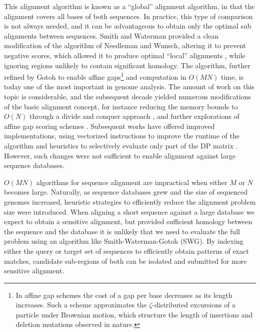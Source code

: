 This alignment algorithm is known as a ``global'' alignment algorithm, in that the alignment covers all bases of both sequences.
In practice, this type of comparison is not always needed, and it can be advantageous to obtain only the optimal sub alignments between sequences.
Smith and Waterman provided a clean modification of the algorithm of Needleman and Wunsch, altering it to prevent negative scores, which allowed it to produce optimal ``local'' alignments \cite{smith1981comparison}, while ignoring regions unlikely to contain significant homology.
The algorithm, further refined by Gotoh \cite{gotoh1982improved} to enable affine gaps\footnote{In affine gap schemes the cost of a gap per base decreases as its length increases. Such a scheme approximates the $\zeta$-distributed excursions of a particle under Brownian motion, which structure the length of insertions and deletion mutations observed in nature.} and computation in $O(MN)$ time, is today one of the most important in genome analysis.
The amount of work on this topic is considerable, and the subsequent decade yielded numerous modifications of the basic alignment concept, for instance reducing the memory bounds to $O(N)$ through a divide and conquer approach \cite{myers1988optimal}, and further explorations of affine gap scoring schemes \cite{altschul1986optimal,gotoh1990optimal}.
Subsequent works have offered improved implementations, using vectorized instructions to improve the runtime of the algorithm \cite{farrar2007striped} and heuristics to selectively evaluate only part of the DP matrix \cite{suzuki2017acceleration}.
However, such changes were not sufficient to enable alignment against large sequence databases.

$O(MN)$ algorithms for sequence alignment are impractical when either $M$ or $N$ becomes large.
Naturally, as sequence databases grew and the size of sequenced genomes increased, heuristic strategies to efficiently reduce the alignment problem size were introduced.
When aligning a short sequence against a large database we expect to obtain a sensitive alignment, but provided sufficient homology between the sequence and the database it is unlikely that we need to evaluate the full problem using an algorithm like Smith-Waterman-Gotoh (SWG).
By indexing either the query or target set of sequences to efficiently obtain patterns of exact matches, candidate sub-regions of both can be isolated and submitted for more sensitive alignment.

